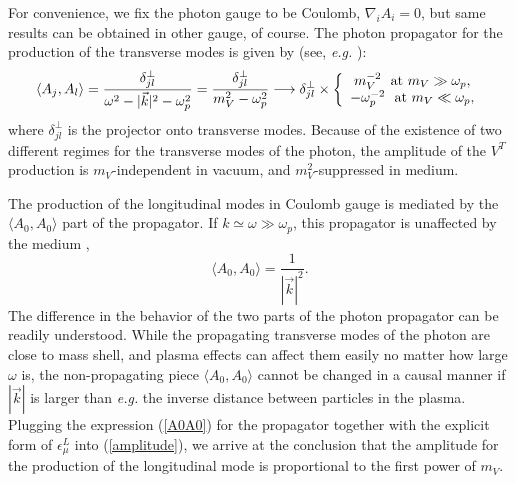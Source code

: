 \documentclass[12pt]{article}
\begin{document}
For convenience, we fix the photon gauge to be Coulomb, $\nabla_i A_i=0$,
but same results can be obtained in other gauge, of course. The photon propagator for the production of the 
transverse modes is given by (see, {\em e.g.} \cite{Braaten:1993jw}):
\begin{eqnarray}
\langle A_j, A_l \rangle = \frac{\delta_{jl}^\perp}{\omega^2-|\vec{k}|^2-\omega_p^2  }
= \frac{\delta_{jl}^\perp}{m_V^2-\omega_p^2  } \longrightarrow 
\delta_{jl}^\perp\times \left\{\begin{array}{c}
m_V^{-2}  ~~ {\rm at} ~ m_V\gg \omega_p,  \\
-\omega_p^{-2} ~~ {\rm at} ~ m_V\ll \omega_p,
\end{array}\right. 
\end{eqnarray}
where $\delta_{jl}^\perp$ is the projector onto transverse modes.
%
Because of the existence of two different regimes for the transverse
modes of the photon, the amplitude of the $V^T$ production is
$m_V$-independent in vacuum, and $m_V^2$-suppressed in medium.

The production of the longitudinal modes in Coulomb gauge is mediated by the $ \langle A_0, A_0 \rangle$
part of the propagator. If $k\simeq \omega\gg \omega_p$, this propagator is unaffected by the medium
\cite{Braaten:1993jw}, 
\begin{equation}
\label{A0A0}
\langle A_0, A_0 \rangle = \frac{1}{|\vec{k}|^2}.
\end{equation}
The difference in the behavior of the two parts of the photon propagator
can be readily understood. While the propagating transverse modes of
the photon are close to mass shell, and plasma effects can affect them
easily no matter how large $\omega$ is, the non-propagating piece
$\langle A_0, A_0 \rangle$ cannot be changed in a causal manner if
$|\vec{k}|$ is larger than {\em e.g.} the inverse distance between
particles in the plasma. Plugging the expression (\ref{A0A0}) for the
propagator together with the explicit form of $\epsilon_\mu^L$ into
(\ref{amplitude}), we arrive at the conclusion that the amplitude for
the production of the longitudinal mode is proportional to the first power
of $m_V$.
\end{document}
